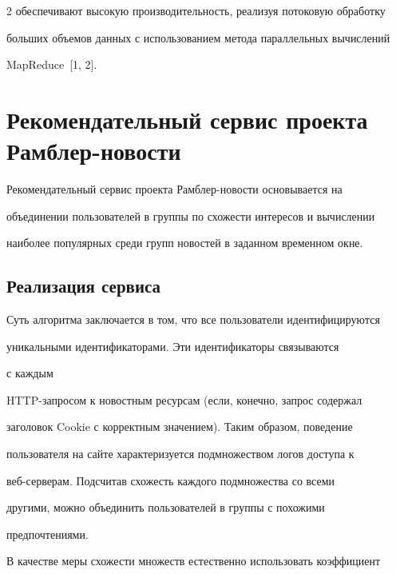 \begin{multicols}{2}
обеспечивают высокую производительность, реализуя потоковую обработку 


больших объемов данных с использованием метода параллельных вычислений 


MapReduce~[1, 2].





\section{Рекомендательный сервис проекта Рамблер-новости}





   Рекомендательный сервис проекта Рамблер-но\-вости основывается на 


объединении пользователей в группы по схожести интересов и вычислении 


наиболее популярных среди групп новостей в заданном временном окне.





\subsection{Реализация сервиса}





   Суть алгоритма заключается в том, что все пользователи идентифицируются 


уникальными идентификаторами. Эти идентификаторы связываются


 с каждым 


HTTP-за\-про\-сом к новостным ресурсам (если, конечно, запрос содержал 


заголовок Cookie с корректным значением). Таким образом, поведение 


пользователя на сайте характеризуется подмножеством логов доступа к 


   веб-сер\-ве\-рам. Подсчитав схожесть каждого подмножества со всеми 


другими, можно объединить пользователей в группы с похожими 


предпочтениями.








   


   В качестве меры схожести множеств естественно использовать коэффициент 



\end{multicols}
